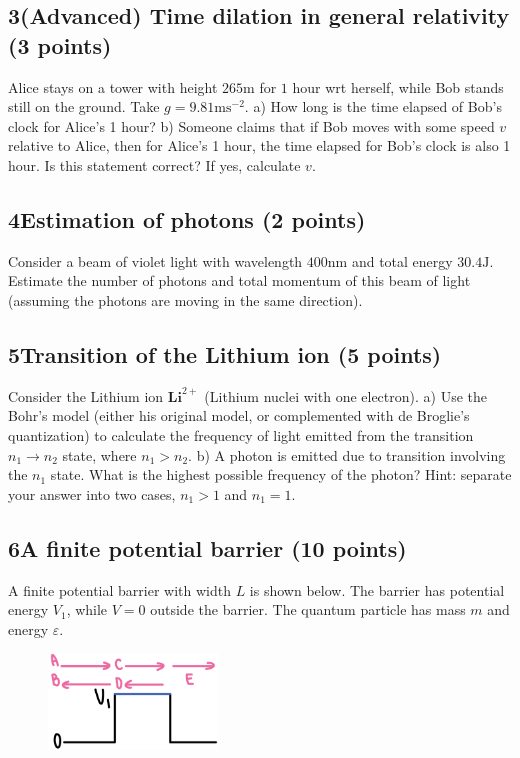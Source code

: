 \documentclass[12pt]{book} %
\numberwithin{equation}{chapter}
\def\e{\varepsilon}
\def\lq{\hspace{2.5ex}}
\begin{document}
\subsection*{3\lq (Advanced) Time dilation in general relativity (3 points)}
Alice stays on a tower with height $265\text{m}$ for $1$ hour wrt herself, while Bob stands still on the ground. Take $g=9.81\text{m}\text{s}^{-2}$.\bigskip\newline
a) How long is the time elapsed of Bob's clock for Alice's 1 hour?\bigskip\newline
b) Someone claims that if Bob moves with some speed $v$ relative to Alice, then for Alice's 1 hour, the time elapsed for Bob's clock is also 1 hour. Is this statement correct? If yes, calculate $v$.

\subsection*{4\lq Estimation of photons (2 points)}
Consider a beam of violet light with wavelength $400\text{nm}$ and total energy $30.4\text{J}$. Estimate the number of photons and total momentum of this beam of light (assuming the photons are moving in the same direction).

\subsection*{5\lq Transition of the Lithium ion (5 points)}
Consider the Lithium ion $\mathbf{Li}^{2+}$ (Lithium nuclei with one electron).\bigskip\newline
a) Use the Bohr's model (either his original model, or complemented with de Broglie's quantization) to calculate the frequency of light emitted from the transition $n_{1}\to n_{2}$ state, where $n_{1}>n_{2}$.\bigskip\newline
b) A photon is emitted due to transition involving the $n_{1}$ state. What is the highest possible frequency of the photon?\bigskip\newline
Hint: separate your answer into two cases, $n_{1}>1$ and $n_{1}=1$.

\subsection*{6\lq A finite potential barrier (10 points)}
A finite potential barrier with width $L$ is shown below. The barrier has potential energy $V_{1}$, while $V=0$ outside the barrier. The quantum particle has mass $m$ and energy $\e$.
\begin{figure}[H]
\centering
\includegraphics[width=0.4\textwidth]{A finite potential barrier}
\end{figure}
\end{document}
